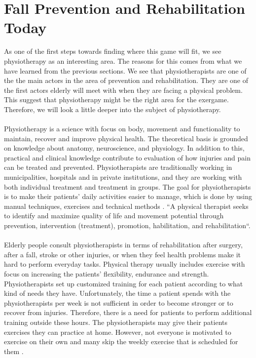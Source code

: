 \section{Fall Prevention and Rehabilitation Today}
As one of the first steps towards finding where this game will fit, we see physiotherapy as an interesting area. The reasons for this comes from what we have learned from the previous sections. We see that physiotherapists are one of the the main actors in the area of prevention and rehabilitation. They are one of the first actors elderly will meet with when they are facing a physical problem. This suggest that physiotherapy might be the right area for the exergame. Therefore, we will look a little deeper into the subject of physiotherapy. \\ \\
Physiotherapy is a science with focus on body, movement and functionality to maintain, recover and improve physical health. The theoretical basis is grounded on knowledge about anatomy, neuroscience, and physiology. In addition to this, practical and clinical knowledge contribute to evaluation of how injuries and pain can be treated and prevented. Physiotherapists are traditionally working in municipalities, hospitals and in private institutions, and they are working with both individual treatment and treatment in groups. The goal for physiotherapists is to make their patients' daily activities easier to manage, which is done by using manual techniques, exercises and technical methods \cite{physiotherapy1}\cite{physiotherapy2}. “A physical therapist seeks to identify and maximize quality of life and movement potential through prevention, intervention (treatment), promotion, habilitation, and rehabilitation“.\\ \\
Elderly people consult physiotherapists in terms of rehabilitation after surgery, after a fall, stroke or other injuries, or when they feel health problems make it hard to perform everyday tasks. Physical therapy usually includes exercise with focus on increasing the patients’ flexibility, endurance and strength. Physiotherapists set up customized training for each patient according to what kind of needs they have. Unfortunately, the time a patient spends with the physiotherapists per week is not sufficient in order to become stronger or to recover from injuries. Therefore, there is a need for patients to perform additional training outside these hours. The physiotherapists may give their patients exercises they can practice at home. However, not everyone is motivated to exercise on their own and many skip the weekly exercise that is scheduled for them \cite{physiotherapy2}. 


